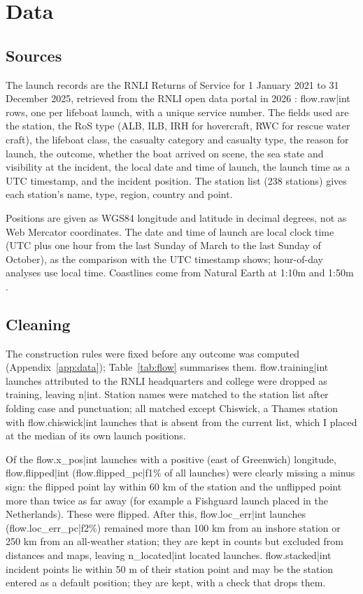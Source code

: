 \documentclass[11pt,a4paper]{article}
\begin{document}
\section{Data}\label{sec:data}
\subsection{Sources}
The launch records are the RNLI Returns of Service for 1 January 2021 to 31 December 2025, retrieved from the RNLI open data portal in 2026 \citep{rnlidata}: {{flow.raw|int}} rows, one per lifeboat launch, with a unique service number. The fields used are the station, the RoS type (ALB, ILB, IRH for hovercraft, RWC for rescue water craft), the lifeboat class, the casualty category and casualty type, the reason for launch, the outcome, whether the boat arrived on scene, the sea state and visibility at the incident, the local date and time of launch, the launch time as a UTC timestamp, and the incident position. The station list (238 stations) gives each station's name, type, region, country and point.

Positions are given as WGS84 longitude and latitude in decimal degrees, not as Web Mercator coordinates. The date and time of launch are local clock time (UTC plus one hour from the last Sunday of March to the last Sunday of October), as the comparison with the UTC timestamp shows; hour-of-day analyses use local time. Coastlines come from Natural Earth at 1:10m and 1:50m \citep{naturalearth}.

\subsection{Cleaning}
The construction rules were fixed before any outcome was computed (Appendix~\ref{app:data}); Table~\ref{tab:flow} summarises them. {{flow.training|int}} launches attributed to the RNLI headquarters and college were dropped as training, leaving {{n|int}}. Station names were matched to the station list after folding case and punctuation; all matched except Chiswick, a Thames station with {{flow.chiswick|int}} launches that is absent from the current list, which I placed at the median of its own launch positions.

Of the {{flow.x_pos|int}} launches with a positive (east of Greenwich) longitude, {{flow.flipped|int}} ({{flow.flipped_pc|f1}}\% of all launches) were clearly missing a minus sign: the flipped point lay within 60 km of the station and the unflipped point more than twice as far away (for example a Fishguard launch placed in the Netherlands). These were flipped. After this, {{flow.loc_err|int}} launches ({{flow.loc_err_pc|f2}}\%) remained more than 100 km from an inshore station or 250 km from an all-weather station; they are kept in counts but excluded from distances and maps, leaving {{n_located|int}} located launches. {{flow.stacked|int}} incident points lie within 50 m of their station point and may be the station entered as a default position; they are kept, with a check that drops them.
\end{document}
